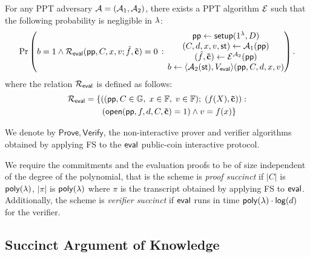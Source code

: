 \begin{definition}[Extractability]
\label{def:pcs-ext-app}
For any PPT adversary $\mathcal{A} = (\mathcal{A}_{1},\mathcal{A}_{2})$, there exists a PPT algorithm $\mathcal{E}$ such that the following probability is negligible in $\lambda$:
	 \[
    \Pr\left(
      \begin{matrix}
      b = 1 \wedge
      \mathcal{R}_{\mathsf{eval}}(\mathsf{pp},C,x,v; \tilde{f},\mathbf{\tilde{c}}) = 0
      \end{matrix}
      \,:\,
      \begin{matrix}
         \mathsf{pp} \leftarrow \mathsf{setup}(1^{\lambda},D) \\
          (C,d,x,v,\mathsf{st}) \leftarrow \mathcal{A}_{1}(\mathsf{pp}) \\
         (\tilde{f},\mathbf{\tilde{c}}) \leftarrow \mathcal{E}^{\mathcal{A}_{2}}(\mathsf{pp})\\
         b \leftarrow \langle \mathcal{A}_{2}(\mathsf{st}), V_{\mathsf{eval}} \rangle(\mathsf{pp},C,d,x,v)
      \end{matrix}
    \right).
  \]
  where the relation $\mathcal{R}_{\mathsf{eval}}$ is defined as follows:
\begin{align*}
        \mathcal{R}_{\mathsf{eval}} &= \{\left((\mathsf{pp},C \in \mathbb{G},\; x \in \mathbb{F}, \; v \in \mathbb{F});\; (f(X), \mathbf{\tilde{c}}) \right) : \\
        &\qquad (
        \mathsf{open}(\mathsf{pp},f,d,C,\mathbf{\tilde{c}}) = 1 )
         \land v = f(x)  \}
    \end{align*} 
    
\end{definition}

We denote by $\mathsf{Prove}, \mathsf{Verify}$, the non-interactive prover and verifier algorithms obtained by applying FS to the 
$\mathsf{eval}$ public-coin interactive protocol.

\begin{definition}[Succinctness]
\label{def:pcs-succinct}
We require the commitments and the evaluation proofs to be of size independent of the degree of the polynomial, that is the scheme is \emph{proof succinct} if
$|C|$ is $\mathsf{poly}(\lambda)$, $|\pi|$ is $\mathsf{poly}(\lambda)$ where $\pi$ is the transcript obtained by applying FS to $\mathsf{eval}$. Additionally, the scheme is \emph{verifier succinct} if $\mathsf{eval}$ runs in time
$\mathsf{poly}(\lambda) \cdot \allowbreak \mathsf{log} (d)$ for the verifier.
\end{definition}


\subsection{Succinct Argument of Knowledge}
\label{sec:aok}